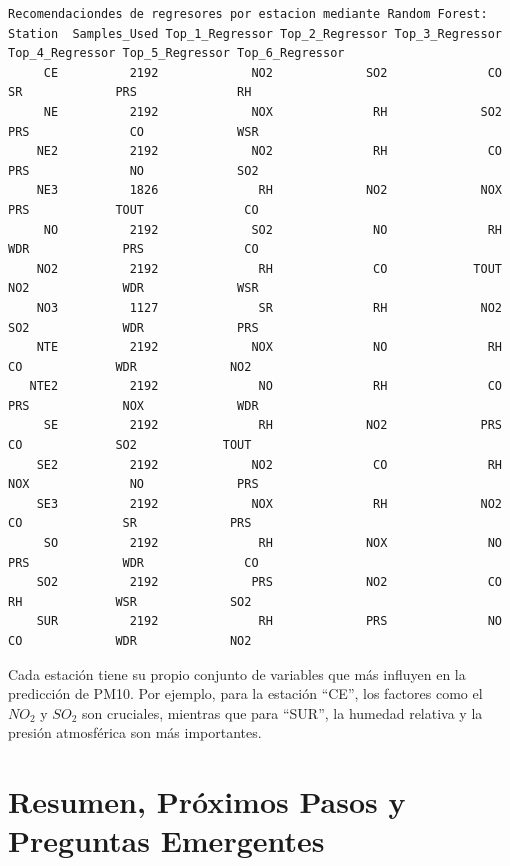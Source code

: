 \documentclass[
  11pt,
  letterpaper,
]{article}
\begin{document}
\protect{}\label{random-forest}
\begin{verbatim}
Recomendaciondes de regresores por estacion mediante Random Forest:
Station  Samples_Used Top_1_Regressor Top_2_Regressor Top_3_Regressor Top_4_Regressor Top_5_Regressor Top_6_Regressor
     CE          2192             NO2             SO2              CO              SR             PRS              RH
     NE          2192             NOX              RH             SO2             PRS              CO             WSR
    NE2          2192             NO2              RH              CO             PRS              NO             SO2
    NE3          1826              RH             NO2             NOX             PRS            TOUT              CO
     NO          2192             SO2              NO              RH             WDR             PRS              CO
    NO2          2192              RH              CO            TOUT             NO2             WDR             WSR
    NO3          1127              SR              RH             NO2             SO2             WDR             PRS
    NTE          2192             NOX              NO              RH              CO             WDR             NO2
   NTE2          2192              NO              RH              CO             PRS             NOX             WDR
     SE          2192              RH             NO2             PRS              CO             SO2            TOUT
    SE2          2192             NO2              CO              RH             NOX              NO             PRS
    SE3          2192             NOX              RH             NO2              CO              SR             PRS
     SO          2192              RH             NOX              NO             PRS             WDR              CO
    SO2          2192             PRS             NO2              CO              RH             WSR             SO2
    SUR          2192              RH             PRS              NO              CO             WDR             NO2
\end{verbatim}

Cada estación tiene su propio conjunto de variables que más influyen en
la predicción de PM10. Por ejemplo, para la estación ``CE'', los
factores como el \(NO_2\) y \(SO_2\) son cruciales, mientras que para
``SUR'', la humedad relativa y la presión atmosférica son más
importantes. \cite{genuer2010variable}

\section{Resumen, Próximos Pasos y Preguntas
Emergentes}\label{resumen-pruxf3ximos-pasos-y-preguntas-emergentes}
\end{document}
